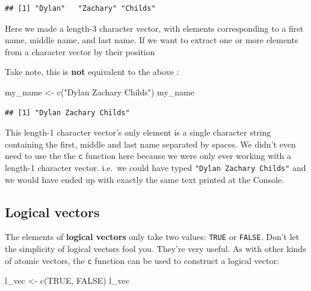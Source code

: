 \documentclass[
]{book}
\newenvironment{Shaded}{\begin{snugshade}}{\end{snugshade}}
\newcommand{\ConstantTok}[1]{\textcolor[rgb]{0.00,0.00,0.00}{#1}}
\newcommand{\FunctionTok}[1]{\textcolor[rgb]{0.00,0.00,0.00}{#1}}
\newcommand{\NormalTok}[1]{#1}
\newcommand{\OtherTok}[1]{\textcolor[rgb]{0.56,0.35,0.01}{#1}}
\newcommand{\StringTok}[1]{\textcolor[rgb]{0.31,0.60,0.02}{#1}}
\begin{document}
\begin{verbatim}
## [1] "Dylan"   "Zachary" "Childs"
\end{verbatim}

Here we made a length-3 character vector, with elements corresponding to a first name, middle name, and last name. If we want to extract one or more elements from a character vector by their position

Take note, this is \textbf{not} equivalent to the above :

\begin{Shaded}
\begin{Highlighting}[]
\NormalTok{my\_name }\OtherTok{\textless{}{-}} \FunctionTok{c}\NormalTok{(}\StringTok{"Dylan Zachary Childs"}\NormalTok{)}
\NormalTok{my\_name}
\end{Highlighting}
\end{Shaded}

\begin{verbatim}
## [1] "Dylan Zachary Childs"
\end{verbatim}

This length-1 character vector's only element is a single character string containing the first, middle and last name separated by spaces. We didn't even need to use the the \texttt{c} function here because we were only ever working with a length-1 character vector. i.e.~we could have typed \texttt{"Dylan\ Zachary\ Childs"} and we would have ended up with exactly the same text printed at the Console.

\hypertarget{logical-vectors}{%
\subsection{Logical vectors}\label{logical-vectors}}

The elements of \textbf{logical vectors} only take two values: \texttt{TRUE} or \texttt{FALSE}. Don't let the simplicity of logical vectors fool you. They're very useful. As with other kinds of atomic vectors, the \texttt{c} function can be used to construct a logical vector:

\begin{Shaded}
\begin{Highlighting}[]
\NormalTok{l\_vec }\OtherTok{\textless{}{-}} \FunctionTok{c}\NormalTok{(}\ConstantTok{TRUE}\NormalTok{, }\ConstantTok{FALSE}\NormalTok{)}
\NormalTok{l\_vec}
\end{Highlighting}
\end{Shaded}
\end{document}
